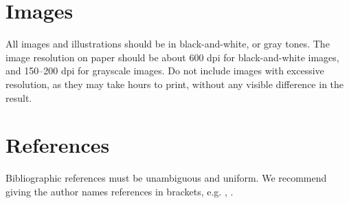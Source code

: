 \documentclass[12pt]{article}
\begin{document}
\section{Images}

All images and illustrations should be in black-and-white, or gray
tones. The image resolution on paper should be about 600 dpi for
black-and-white images, and 150--200 dpi for grayscale images. Do not
include images with excessive resolution, as they may take hours to
print, without any visible difference in the result.

\section{References}

Bibliographic references must be unambiguous and uniform. We recommend
giving the author names references in brackets, e.g. \cite{knuth:89}, \cite{smith:99}.



\end{document}
